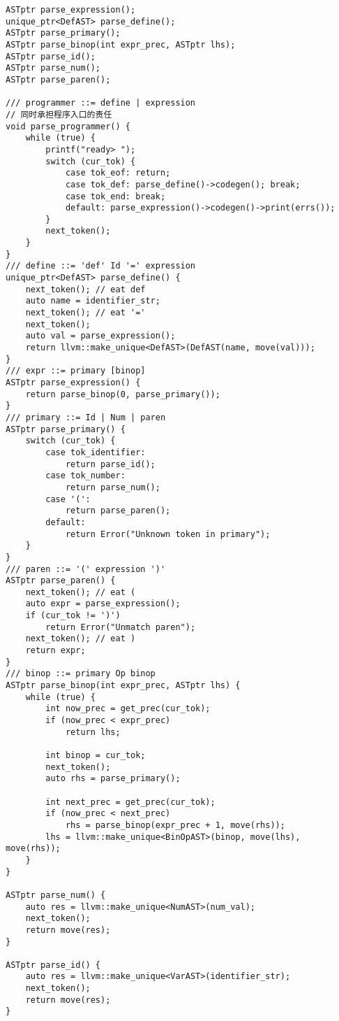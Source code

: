 \documentclass[UTF8]{ctexart}
\begin{document}
\begin{lstlisting}[title=解析器, frame=shadowbox] 
ASTptr parse_expression();
unique_ptr<DefAST> parse_define();
ASTptr parse_primary();
ASTptr parse_binop(int expr_prec, ASTptr lhs);
ASTptr parse_id();
ASTptr parse_num();
ASTptr parse_paren();

/// programmer ::= define | expression
// 同时承担程序入口的责任
void parse_programmer() {
    while (true) {
        printf("ready> ");
        switch (cur_tok) {
            case tok_eof: return;
            case tok_def: parse_define()->codegen(); break;
            case tok_end: break;
            default: parse_expression()->codegen()->print(errs());
        }
        next_token();
    }
}
/// define ::= 'def' Id '=' expression
unique_ptr<DefAST> parse_define() {
    next_token(); // eat def
    auto name = identifier_str;
    next_token(); // eat '='
    next_token();
    auto val = parse_expression();
    return llvm::make_unique<DefAST>(DefAST(name, move(val)));
}
/// expr ::= primary [binop]
ASTptr parse_expression() {
    return parse_binop(0, parse_primary());
}
/// primary ::= Id | Num | paren
ASTptr parse_primary() {
    switch (cur_tok) {
        case tok_identifier:
            return parse_id();
        case tok_number: 
            return parse_num();
        case '(':
            return parse_paren();
        default:
            return Error("Unknown token in primary");
    }
}
/// paren ::= '(' expression ')'
ASTptr parse_paren() {
    next_token(); // eat (
    auto expr = parse_expression();
    if (cur_tok != ')')
        return Error("Unmatch paren");
    next_token(); // eat )
    return expr;
}
/// binop ::= primary Op binop
ASTptr parse_binop(int expr_prec, ASTptr lhs) {
    while (true) {
        int now_prec = get_prec(cur_tok);
        if (now_prec < expr_prec)
            return lhs;
            
        int binop = cur_tok;
        next_token(); 
        auto rhs = parse_primary();

        int next_prec = get_prec(cur_tok);
        if (now_prec < next_prec) 
            rhs = parse_binop(expr_prec + 1, move(rhs));
        lhs = llvm::make_unique<BinOpAST>(binop, move(lhs), move(rhs));
    }
}

ASTptr parse_num() {
    auto res = llvm::make_unique<NumAST>(num_val);
    next_token();
    return move(res);
}
 
ASTptr parse_id() {
    auto res = llvm::make_unique<VarAST>(identifier_str);
    next_token();
    return move(res);
}
\end{lstlisting}
\end{document}
